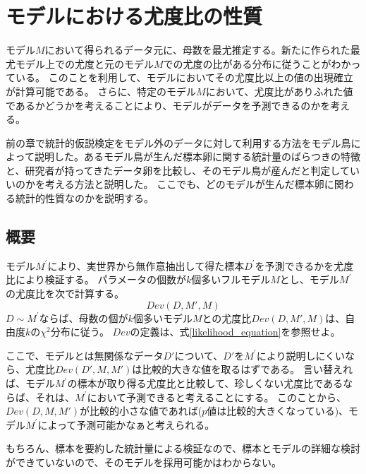 \chapter{モデルにおける尤度比の性質}
モデル$M$において得られるデータ元に、母数を最尤推定する。新たに作られた最尤モデル上での尤度と元のモデル$M$での尤度の比がある分布に従うことがわかっている。
このことを利用して、モデルにおいてその尤度比以上の値の出現確立が計算可能である。
さらに、特定のモデル$M$において、尤度比がありふれた値であるかどうかを考えることにより、モデルがデータを予測できるのかを考える。

前の章で統計的仮説検定をモデル外のデータに対して利用する方法をモデル鳥によって説明した。あるモデル鳥が生んだ標本卵に関する統計量のばらつきの特徴と、研究者が持ってきたデータ卵を比較し、そのモデル鳥が産んだと判定していいのかを考える方法と説明した。
ここでも、どのモデルが生んだ標本卵に関わる統計的性質なのかを説明する。



\section{概要}

モデル$M^{'}$により、実世界から無作意抽出して得た標本$D^{'}$を予測できるかを尤度比により検証する。
パラメータの個数が$k$個多いフルモデル$M$とし、モデル$M^{'}$の尤度比を次で計算する。
\begin{equation*}
    Dev(D,M',M)
\end{equation*}
$D\sim M^{'}$ならば、母数の個が$k$個多いモデル$M$との尤度比$Dev(D,M',M)$は、自由度$k$の$\chi^2$分布に従う。
$Dev$の定義は、式\ref{likelihood_equation}を参照せよ。

ここで、モデルとは無関係なデータ$D'$について、$D'$を$M^{'}$により説明しにくいなら、尤度比$Dev(D',M,M')$は比較的大きな値を取るはずである。
言い替えれば、モデル$M^{'}$の標本が取り得る尤度比と比較して、珍しくない尤度比であるならば、それは、$M^{'}$において予測できると考えることにする。
このことから、$Dev(D,M,M')$が比較的小さな値であれば($p$値は比較的大きくなっている)、モデル$M^{'}$によって予測可能かなぁと考えられる。

もちろん、標本を要約した統計量による検証なので、標本とモデルの詳細な検討ができていないので、そのモデルを採用可能かはわからない。

